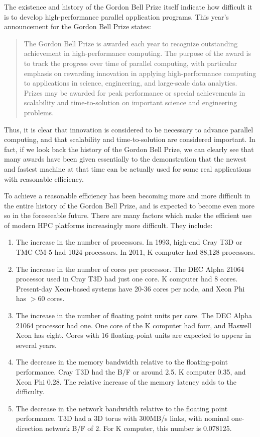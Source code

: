\documentclass[dvipdfmx]{acm_proc_article-sp}
\begin{document}
The existence and history of the Gordon Bell Prize itself indicate how
difficult it is to develop high-performance parallel application
programs. This year's announcement for the Gordon Bell Prize states:

\begin{quote}
   The Gordon Bell Prize is awarded each year to recognize outstanding
   achievement in high-performance computing. The purpose of the award
   is to track the progress over time of parallel computing, with
   particular emphasis on rewarding innovation in applying
   high-performance computing to applications in science, engineering,
   and large-scale data analytics. Prizes may be awarded for peak
   performance or special achievements in scalability and
   time-to-solution on important science and engineering problems.
\end{quote}

Thus, it is clear that innovation is considered to be necessary to
advance parallel computing, and that scalability and time-to-solution
are considered important. In fact, if we look back the history of the
Gordon Bell Prize, we can clearly see that many awards have been given
essentially to the demonstration that the newest and fastest machine
at that time can be actually used for some real applications with
reasonable efficiency. 

To achieve a reasonable efficiency has been becoming more and more
difficult in the entire history of the Gordon Bell Prize, and is
expected  to become even more so in the foreseeable future. There are
many factors which make the efficient use of modern HPC platforms
increasingly more difficult. They include:

\begin{enumerate}

  \item The increase in the number of processors. In 1993, high-end
    Cray T3D or TMC CM-5 had 1024 processors. In 2011, K computer had
    88,128 processors.
  \item The increase in the number of cores per processor. The DEC
    Alpha 21064 processor used in Cray T3D had just one core. K computer
    had 8 cores. Present-day Xeon-based systems have 20-36 cores per
    node, and Xeon Phi has $>60$ cores.
  \item The increase in the number of floating point units per core.
    The DEC     Alpha 21064 processor had one. One core of the K
    computer had four, and Haswell Xeon has eight. Cores with 16
    floating-point units are expected to appear in several years.
  \item The decrease in the memory bandwidth relative to the
    floating-point performance. Cray T3D had the B/F or around 2.5.
    K computer 0.35, and Xeon Phi 0.28. The relative increase of the
    memory latency adds to the difficulty. 
  \item The decrease in the network bandwidth relative to the floating
    point performance. T3D had a 3D torus with 300MB/s links, with
    nominal one-direction network B/F of 2. For K computer, this
    number is 0.078125.
\end{enumerate}
\end{document}
